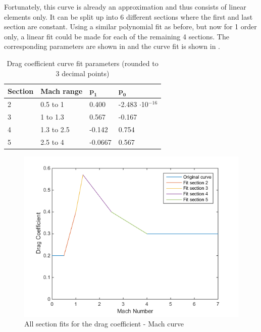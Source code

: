 Fortunately, this curve is already an approximation and thus consists of linear elements only. It can be split up into 6 different sections where the first and last section are constant. Using a similar polynomial fit as before, but now for 1 order only, a linear fit could be made for each of the remaining 4 sections. The corresponding parameters are shown in  and the curve fit is shown in .


\begin{table}[!ht]
\begin{center}
\caption{Drag coefficient curve fit parameters (rounded to 3 decimal points)}
\label{tab:dragCoeffPara}
\begin{tabular}{|l|l||l|l|}
\hline 
\textbf{Section}  & \textbf{Mach range}& $\mathbf{p_{1}}$ & $\mathbf{p_{0}}$ \\ \hline 
2  & 0.5 to 1  & 0.400 & -2.483 $\cdot$10$^{-16}$  \\ \hline
3  & 1 to 1.3  & 0.567 & -0.167  \\ \hline
4  &  1.3 to 2.5 & -0.142 & 0.754 \\ \hline
5  &  2.5 to 4 & -0.0667 & 0.567 \\ \hline
\end{tabular}
\end{center}
\end{table}



\begin{figure}[!ht]
\centering
\includegraphics[width=1.0\textwidth]{figures/software/dragCoeffFit.png}
\caption{All section fits for the drag coefficient - Mach curve}
\label{fig:dragCoeffFit}
\end{figure}




